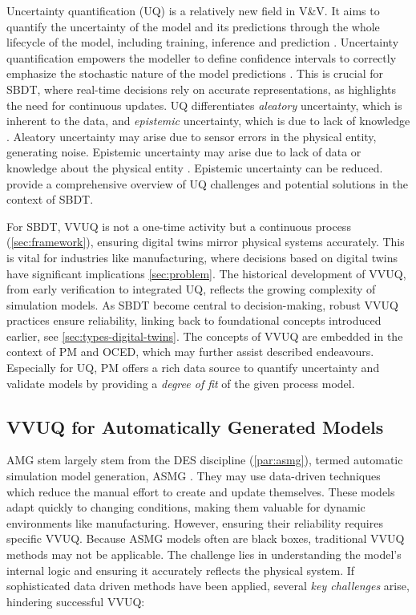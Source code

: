 \label{sec:uncertainty-quantification}
Uncertainty quantification (UQ) is a relatively new field in V&V. It aims to quantify the uncertainty of the model and its predictions through the whole lifecycle of the model, including training, inference and prediction \autocite{sel2025survey}. Uncertainty quantification empowers the modeller to define confidence intervals to correctly emphasize the stochastic nature of the model predictions \autocite{volodina2021importance}. This is crucial for SBDT, where real-time decisions rely on accurate representations, as \autocite{francis2021towards} highlights the need for continuous updates. UQ differentiates \textit{aleatory} uncertainty, which is inherent to the data, and \textit{epistemic} uncertainty, which is due to lack of knowledge \autocite{sel2025survey}. Aleatory uncertainty may arise due to sensor errors in the physical entity, generating noise. Epistemic uncertainty may arise due to lack of data or knowledge about the physical entity \autocite{thelen2023comprehensive}. Epistemic uncertainty can be reduced. \Autocite{abdoune2022handling} provide a comprehensive overview of UQ challenges and potential solutions in the context of SBDT.

For SBDT, VVUQ is not a one-time activity but a continuous process (\autoref{sec:framework}), ensuring digital twins mirror physical systems accurately. This is vital for industries like manufacturing, where decisions based on digital twins have significant implications \autoref{sec:problem}.
The historical development of VVUQ, from early verification to integrated UQ, reflects the growing complexity of simulation models. As SBDT become central to decision-making, robust VVUQ practices ensure reliability, linking back to foundational concepts introduced earlier, see \autoref{sec:types-digital-twins}. The concepts of VVUQ are embedded in the context of PM and OCED, which may further assist described endeavours. Especially for UQ, PM offers a rich data source to quantify uncertainty and validate models by providing a \textit{degree of fit} of the given process model.


\subsection{VVUQ for Automatically Generated Models}
\label{sec:requirements-automatically-generated-models}
AMG stem largely stem from the DES discipline (\autoref{par:asmg}), termed automatic simulation model generation, ASMG \autocite{mildeautomated,Charpentier2014}. They may use data-driven techniques which reduce the manual effort to create and update themselves. These models adapt quickly to changing conditions, making them valuable for dynamic environments like manufacturing. However, ensuring their reliability requires specific VVUQ. Because ASMG models often are black boxes, traditional VVUQ methods may not be applicable. The challenge lies in understanding the model's internal logic and ensuring it accurately reflects the physical system. If sophisticated data driven methods have been applied, several \textit{key challenges} arise, hindering successful VVUQ:

